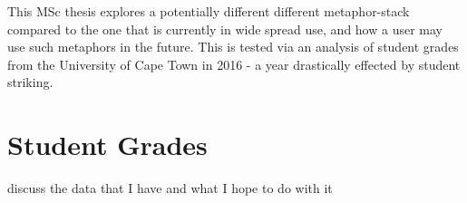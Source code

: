 This MSc thesis explores a potentially different different metaphor-stack compared to the one that is currently in wide spread use, and how a user may use such metaphors in the future. This is tested via an analysis of student grades from the University of Cape Town in 2016 - a year drastically effected by student striking.

\section{Student Grades}
discuss the data that I have and what I hope to do with it